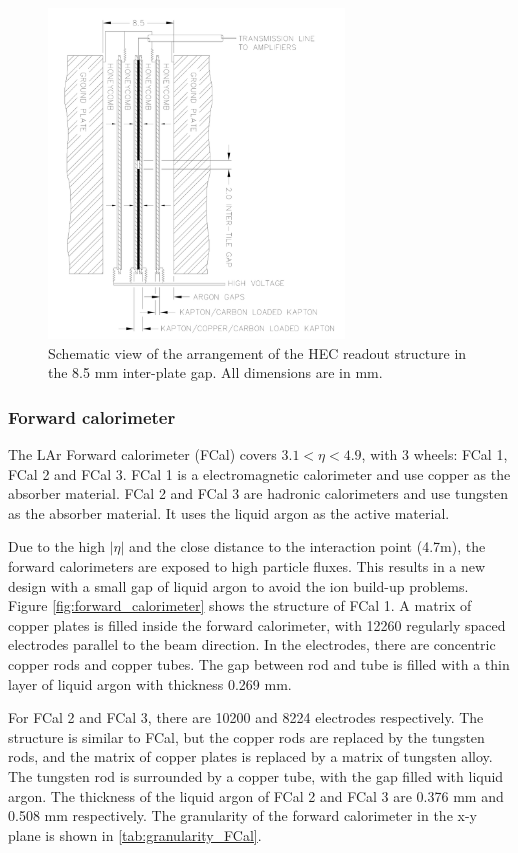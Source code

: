 \begin{figure}
\centering
\includegraphics[width=0.7\textwidth]{data/photo/detector/HEC.png}
\caption{Schematic view of the arrangement of the HEC readout structure in the 8.5 mm inter-plate gap. All dimensions are in mm. \cite{ATLAS_doc}}
\label{fig:HEC}
\end{figure}

\subsubsection{Forward calorimeter}
The LAr Forward calorimeter (FCal) covers $3.1<\eta<4.9$, with 3 wheels: FCal 1, FCal 2 and FCal 3.
FCal 1 is a electromagnetic calorimeter and use copper as the absorber material.
FCal 2 and FCal 3 are hadronic calorimeters and use tungsten as the absorber material.
It uses the liquid argon as the active material.

Due to the high $|\eta|$ and the close distance to the interaction point (4.7m), the forward calorimeters are exposed to high particle fluxes.
This results in a new design with a small gap of liquid argon to avoid the ion build-up problems.
Figure \ref{fig:forward_calorimeter} shows the structure of FCal 1.
A matrix of copper plates is filled inside the forward calorimeter, with 12260 regularly spaced electrodes parallel to the beam direction.
In the electrodes, there are concentric copper rods and copper tubes.
The gap between rod and tube is filled with a thin layer of liquid argon with thickness 0.269 mm.

For FCal 2 and FCal 3, there are 10200 and 8224 electrodes respectively.
The structure is similar to FCal, but the copper rods are replaced by the tungsten rods, and the matrix of copper plates is replaced by a matrix of tungsten alloy.
The tungsten rod is surrounded by a copper tube, with the gap filled with liquid argon.
The thickness of the liquid argon of FCal 2 and FCal 3 are 0.376 mm and 0.508 mm respectively.
The granularity of the forward calorimeter in the x-y plane is shown in \ref{tab:granularity_FCal}.

